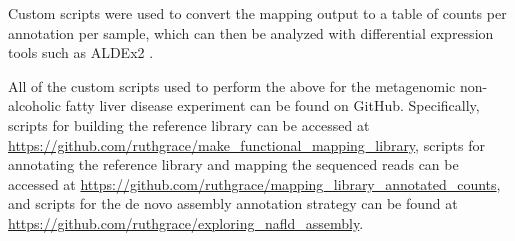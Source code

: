 Custom scripts were used to convert the mapping output to a table of counts per annotation per sample, which can then be analyzed with differential expression tools such as ALDEx2 \cite{fernandes2014unifying}.

All of the custom scripts used to perform the above for the metagenomic non-alcoholic fatty liver disease experiment can be found on GitHub. Specifically, scripts for building the reference library can be accessed at \url{https://github.com/ruthgrace/make_functional_mapping_library}, scripts for annotating the reference library and mapping the sequenced reads can be accessed at \url{https://github.com/ruthgrace/mapping_library_annotated_counts}, and scripts for the de novo assembly annotation strategy can be found at \url{https://github.com/ruthgrace/exploring_nafld_assembly}.
